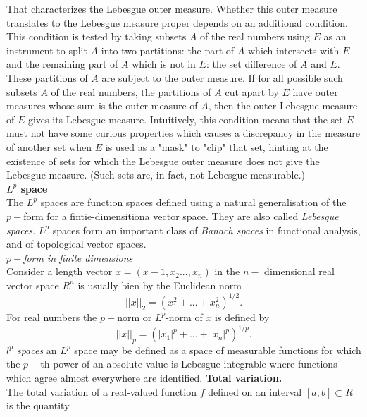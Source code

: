 \documentclass[11pt,a4paper,headinclude=true,DIV=14,BCOR=8mm,chapterprefix,listof=totoc,twoside,openright,abstracton]{scrbook}
\begin{document}
\begin{sidenote}
    That characterizes the Lebesgue outer measure. Whether this outer measure translates to the Lebesgue measure proper depends on an additional condition. This condition is tested by taking subsets $A$ of the real numbers using $E$ as an instrument to split $A$ into two partitions: the part of $A$ which intersects with $E$ and the remaining part of $A$ which is not in $E$: the set difference of $A$ and $E$. These partitions of $A$ are subject to the outer measure. If for all possible such subsets $A$ of the real numbers, the partitions of $A$ cut apart by $E$ have outer measures whose sum is the outer measure of $A$, then the outer Lebesgue measure of $E$ gives its Lebesgue measure. Intuitively, this condition means that the set $E$ must not have some curious properties which causes a discrepancy in the measure of another set when $E$ is used as a "mask" to "clip" that set, hinting at the existence of sets for which the Lebesgue outer measure does not give the Lebesgue measure. (Such sets are, in fact, not Lebesgue-measurable.)\\
    \textbf{$L^p$ space} \\
    The $L^p$ spaces are function spaces defined using a natural generalisation of the $p-$form for a fintie-dimensitiona vector space. They are also called \textit{Lebesgue spaces}. $L^p$ spaces form an important class of \textit{Banach spaces} in functional analysis, and of topological vector spaces. \\
    \textit{$p-$form in finite dimensions} \\
    Consider a length vector $x=(x-1, x_2...,x_n)$ in the $n-$ dimensional real vector space $R^n$ is usually bien by the Euclidean norm 
    \begin{equation}
        ||x||_2 = (x_1 ^2 + ... + x_n ^2)^{1/2}.
    \end{equation}
    For real numbers the $p-$norm or $L^p$-norm of $x$ is defined by
    \begin{equation}
        ||x||_p = (|x_1|^p + ... + |x_n|^p)^{1/p}.
    \end{equation}
    \textit{$l^p$ spaces}
    an $L^p$ space may be defined as a space of measurable functions for which the $p-$th power of an absolute value is  Lebesgue integrable where functions which agree almost everywhere are identified.
    \textbf{Total variation.} \\
    The total variation of a real-valued function $f$ defined on an interval $[a,b]\subset R$ is the quantity 
    \begin{equation}

\end{equation}
\end{sidenote}
\end{document}
